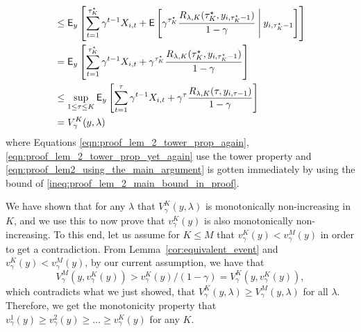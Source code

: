 \begin{myproof}[Proof.]
\begin{align}
	& \le  \E_{y}\left[\sum_{t=1}^{\tau^\star_K}\gamma^{t-1} X_{i,t} + \Ee{\gamma^{\tau^\star_K}  \frac{R_{\lambda,K}(\tau^\star_K, y_{i,\tau^\star_K-1})}{1-\gamma} \given[\Bigg] y_{i,\tau^\star_K-1}}\right] \label{eqn:proof_lem2_using_the_main_argument} \\
	& =  \E_{y}\left[\sum_{t=1}^{\tau^\star_K}\gamma^{t-1} X_{i,t} +  \gamma^{\tau^\star_K}  \frac{R_{\lambda,K}(\tau^\star_K, y_{i,\tau^\star_K-1})}{1-\gamma}\right] \label{eqn:proof_lem_2_tower_prop_yet_again} \\
	& \le \sup_{1 \le \tau \le K}  \E_{y}\left[\sum_{t=1}^{\tau}\gamma^{t-1} X_{i,t} +  \gamma^{\tau}  \frac{R_{\lambda,K}(\tau, y_{i,\tau-1})}{1-\gamma}\right] \nonumber \\
	& = V^K_{\gamma}(y, \lambda)
	\end{align}
	where Equations \eqref{eqn:proof_lem_2_tower_prop_again}, \eqref{eqn:proof_lem_2_tower_prop_yet_again} use the tower property and \eqref{eqn:proof_lem2_using_the_main_argument} is gotten immediately by using the bound of \eqref{ineq:proof_lem_2_main_bound_in_proof}.
	
	We have shown that for any $\lambda$  that $V^K_\gamma(y, \lambda)$ is monotonically non-increasing in $K$, and we use this to now prove that $v^K_\gamma(y)$ is also monotonically non-increasing. To this end, let us assume for $K \le M$ that $v^K_\gamma(y) < v^M_\gamma(y)$ in order to get a contradiction. From Lemma~\ref{cor:equivalent_event} and $v^K_\gamma(y) < v^M_\gamma(y)$, by our current assumption, we have that 
	\begin{equation}
		V^M_\gamma(y, v^K_\gamma(y)) > v^K_\gamma(y)/(1-\gamma) = V^K_\gamma(y, v^K_\gamma(y)),
	\end{equation}
	which contradicts what we just showed, that $V^K_{\gamma}( y, \lambda) \ge V^M_{\gamma}(y, \lambda)$ for all $\lambda$. Therefore, we get the monotonicity property that $v^1_\gamma(y) \geq v^2_\gamma(y) \geq \ldots \geq v^K_\gamma(y)$ for any $K$.
	

\end{myproof}
